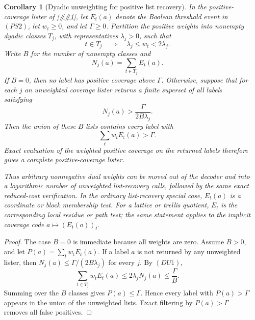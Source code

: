 \documentclass[10pt]{article}
\newcommand{\cref}[1]{\ref{##1}}
\newtheorem{corollary}[theorem]{Corollary}
\theoremstyle{definition}
\begin{document}
\begin{corollary}[Dyadic unweighting for positive list recovery]
   \label{cor:dyadic-positive-list-recovery}
   In the positive-coverage lister of \cref{cor:positive-coverage-screen}, let
   \(E_t(a)\) denote the Boolean threshold event in \((PS2)\), let
   \(w_t\ge0\), and let \(\Gamma\ge0\).  Partition the positive weights into
   nonempty dyadic classes \(T_j\), with representatives \(\lambda_j>0\),
   such that
   \[
      t\in T_j
      \quad\Longrightarrow\quad
      \lambda_j\le w_t<2\lambda_j .
      \tag{DU1}
   \]
   Write \(B\) for the number of nonempty classes and
   \[
      N_j(a)=\sum_{t\in T_j}E_t(a).
      \tag{DU2}
   \]
   If \(B=0\), then no label has positive coverage above \(\Gamma\).  Otherwise,
   suppose that for each \(j\) an unweighted coverage lister returns a finite
   superset of all labels satisfying
   \[
      N_j(a)>
      \frac{\Gamma}{2B\lambda_j}.
      \tag{DU3}
   \]
   Then the union of these \(B\) lists contains every label with
   \[
      \sum_t w_tE_t(a)>\Gamma .
      \tag{DU4}
   \]
   Exact evaluation of the weighted positive coverage on the returned labels
   therefore gives a complete positive-coverage lister.

   Thus arbitrary nonnegative dual weights can be moved out of the decoder and
   into a logarithmic number of unweighted list-recovery calls, followed by the
   same exact reduced-cost verification.  In the ordinary list-recovery special
   case, \(E_t(a)\) is a coordinate or block membership test.  For a lattice or
   trellis quotient, \(E_t\) is the corresponding local residue or path test;
   the same statement applies to the implicit coverage code
   \(a\mapsto(E_t(a))_t\).
\end{corollary}

\begin{proof}
   The case \(B=0\) is immediate because all weights are zero.  Assume
   \(B>0\), and let \(P(a)=\sum_t w_tE_t(a)\).  If a label \(a\) is not
   returned by any unweighted lister, then \(N_j(a)\le
   \Gamma/(2B\lambda_j)\) for every \(j\).  By \((DU1)\),
   \[
      \sum_{t\in T_j}w_tE_t(a)
      \le
      2\lambda_j N_j(a)
      \le
      \frac{\Gamma}{B}.
   \]
   Summing over the \(B\) classes gives \(P(a)\le\Gamma\).  Hence every label
   with \(P(a)>\Gamma\) appears in the union of the unweighted lists.  Exact
   filtering by \(P(a)>\Gamma\) removes all false positives.
\end{proof}
\end{document}
